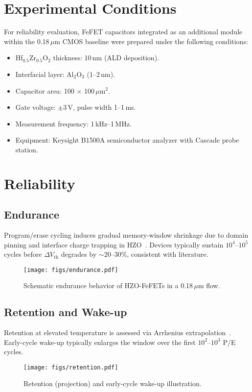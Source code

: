 \documentclass[conference]{IEEEtran}
\begin{document}
\section{Experimental Conditions}
For reliability evaluation, FeFET capacitors integrated as an additional module within the 0.18\,$\mu$m CMOS baseline were prepared under the following conditions:

\begin{itemize}
  \item Hf$_{0.5}$Zr$_{0.5}$O$_2$ thickness: 10\,nm (ALD deposition).
  \item Interfacial layer: Al$_2$O$_3$ (1--2\,nm).
  \item Capacitor area: 100 $\times$ 100\,$\mu$m$^2$.
  \item Gate voltage: $\pm$3\,V, pulse width 1--1\,ms.
  \item Measurement frequency: 1\,kHz--1\,MHz.
  \item Equipment: Keysight B1500A semiconductor analyzer with Cascade probe station.
\end{itemize}

\section{Reliability}
\subsection{Endurance}
Program/erase cycling induces gradual memory-window shrinkage due to domain pinning and interface charge trapping in HZO~\cite{mueller2015, park2020}. Devices typically sustain $10^4$--$10^5$ cycles before $\Delta V_\text{th}$ degrades by $\sim$20--30\%, consistent with literature.

\begin{figure}[h]
\centering
\texttt{[image: figs/endurance.pdf]}
\caption{Schematic endurance behavior of HZO-FeFETs in a 0.18\,$\mu$m flow.}
\end{figure}

\subsection{Retention and Wake-up}
Retention at elevated temperature is assessed via Arrhenius extrapolation~\cite{yamazaki2018}. Early-cycle wake-up typically enlarges the window over the first $10^2$--$10^3$ P/E cycles.

\begin{figure}[h]
\centering
\texttt{[image: figs/retention.pdf]}
\caption{Retention (projection) and early-cycle wake-up illustration.}
\end{figure}
\end{document}
